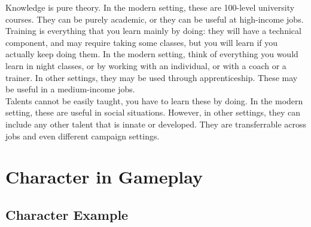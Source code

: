 \documentclass{LegrandOrangeTufteBook}
\newcommand{\term}[1]{\textcolor{colorTerm}{#1}}
\begin{document}


\term{Knowledge} is pure theory. In the modern setting, these are 100-level university courses. They can be purely academic, or they can be useful at high-income jobs.\\
\term{Training} is everything that you learn mainly by doing: 
they will have a technical component, and may require taking some classes, but you will learn if you actually keep doing them.
In the modern setting, think of everything you would learn in night classes, or by working with an individual, or with a coach or a trainer.
In other settings, they may be used through apprenticeship.
These may be useful in a medium-income jobs.\\
\term{Talents} cannot be easily taught, you have to learn these by doing. 
In the modern setting, these are useful in social situations.
However, in other settings, they can include any other talent that is innate or developed.
They are transferrable across jobs and even different campaign settings.\\

\section*{Character in Gameplay}

\subsection*{Character Example}
\end{document}
